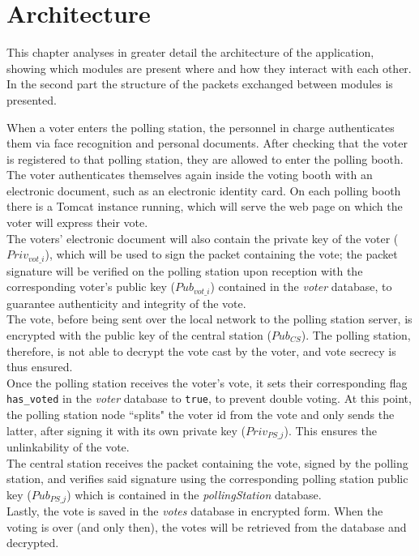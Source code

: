 %
\chapter{Architecture}\label{ch:architecture}
This chapter analyses in greater detail the architecture of the application, showing which modules are present where and how they interact with each other. In the second part the structure of the packets exchanged between modules is presented.
\hfill \break


When a voter enters the polling station, the personnel in charge authenticates them via face recognition and personal documents. After checking that the voter is registered to that polling station, they are allowed to enter the polling booth.\\ The voter authenticates themselves again inside the voting booth with an electronic document, such as an electronic identity card. On each polling booth there is a Tomcat instance running, which will serve the web page on which the voter will express their vote.\\
The voters' electronic document will also contain the private key of the voter ($Priv_{vot\_i}$), which will be used to sign the packet containing the vote; the packet signature will be verified on the polling station upon reception with the corresponding voter's public key ($Pub_{vot\_i}$) contained in the \textit{voter} database, to guarantee authenticity and integrity of the vote.\\
\pagebreak
The vote, before being sent over the local network to the polling station server, is encrypted with the public key of the central station ($Pub_{CS}$). The polling station, therefore, is not able to decrypt the vote cast by the voter, and vote secrecy is thus ensured.\\
Once the polling station receives the voter's vote, it sets their corresponding flag \texttt{has\_voted} in the \textit{voter} database to \texttt{true}, to prevent double voting. At this point, the polling station node ``splits" the voter id from the vote and only sends the latter, after signing it with its own private key ($Priv_{PS\_j}$). This ensures the unlinkability of the vote.\\
The central station receives the packet containing the vote, signed by the polling station, and verifies said signature using the corresponding polling station public key ($Pub_{PS\_j}$) which is contained in the \textit{pollingStation} database.\\
Lastly, the vote is saved in the \textit{votes} database in encrypted form. When the voting is over (and only then), the votes will be retrieved from the database and decrypted.

